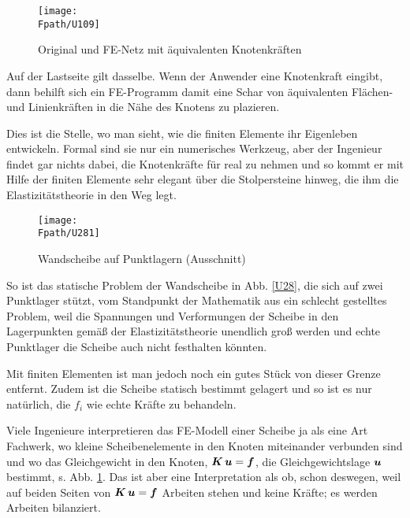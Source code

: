 {{{{{{%
\begin{figure}
\centering
\if {} \sidecaption[t] \fi
{\texttt{[image: \\Fpath/U109]}}
\caption{Original und FE-Netz mit \"{a}quivalenten Knotenkr\"{a}ften}
\label{U109}%
\end{figure}%

Auf der Lastseite gilt dasselbe. Wenn der Anwender eine Knotenkraft eingibt, dann behilft sich ein FE-Programm damit eine Schar von \"{a}quivalenten Fl\"{a}chen- und Linienkr\"{a}ften in die N\"{a}he des Knotens zu plazieren.

Dies ist die Stelle, wo man sieht, wie die finiten Elemente ihr Eigenleben entwickeln. Formal sind sie nur ein numerisches Werkzeug, aber der Ingenieur findet gar nichts dabei, die Knotenkr\"{a}fte f\"{u}r real zu nehmen und so kommt er mit Hilfe der finiten Elemente sehr elegant \"{u}ber die Stolpersteine hinweg, die ihm die Elastizit\"{a}tstheorie in den Weg legt.

\begin{figure}
\centering
\if {} \sidecaption[t] \fi
{\texttt{[image: \\Fpath/U281]}}
\caption{Wandscheibe auf Punktlagern (Ausschnitt)}  %
\label{U281}%
\end{figure}%

So ist das statische Problem der Wandscheibe in Abb. \ref{U28}, die sich auf zwei Punktlager st\"{u}tzt, vom  Standpunkt der Mathematik aus ein schlecht gestelltes Problem, weil die Spannungen und Verformungen der Scheibe in den Lagerpunkten gem\"{a}{\ss} der Elastizit\"{a}tstheorie unendlich gro{\ss} werden und echte Punktlager die Scheibe auch nicht festhalten k\"{o}nnten.

Mit finiten Elementen ist man jedoch noch ein gutes St\"{u}ck von dieser Grenze entfernt. Zudem ist
die Scheibe statisch bestimmt gelagert und so ist es nur nat\"{u}rlich, die $f_i$ wie echte Kr\"{a}fte zu behandeln.

Viele Ingenieure interpretieren das FE-Modell einer Scheibe ja als eine Art \glq Fachwerk\grq{}, wo kleine Scheibenelemente in den Knoten miteinander verbunden sind und wo das Gleichgewicht in den Knoten, $\mbox{\boldmath $K$}\,\mbox{\boldmath $u$} = \mbox{\boldmath $f$}$, die Gleichgewichtslage $\mbox{\boldmath $u$}$ bestimmt, s. Abb. \ref{U109}. Das ist aber eine Interpretation \glq als ob\grq{}, schon deswegen, weil auf beiden Seiten von $\mbox{\boldmath $K$}\,\mbox{\boldmath $u$} = \mbox{\boldmath $f$}$ Arbeiten stehen und keine Kr\"{a}fte; es werden Arbeiten bilanziert.

}}}}}}
